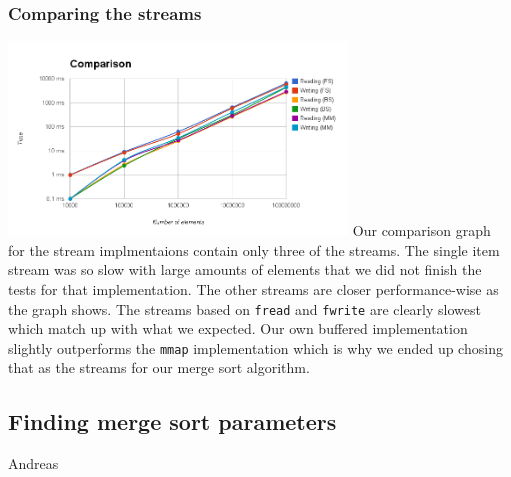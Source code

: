 \subsubsection{Comparing the streams}
\includegraphics[width=90mm]{parts/StreamCompare.png}
Our comparison graph for the stream implmentaions contain only three of the streams. The single item stream was so slow with large amounts of elements that we did not finish the tests for that implementation. The other streams are closer performance-wise as the graph shows. The streams based on \texttt{fread} and \texttt{fwrite} are clearly slowest which match up with what we expected. Our own buffered implementation slightly outperforms the \texttt{mmap} implementation which is why we ended up chosing that as the streams for our merge sort algorithm.

\subsection{ Finding merge sort parameters}
Andreas

